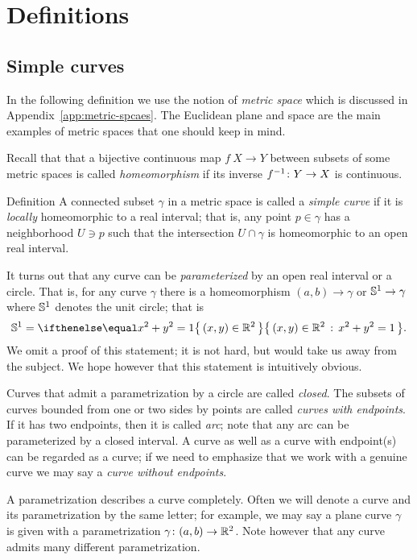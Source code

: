 \chapter{Definitions}


\section*{Simple curves}

In the following definition we use the notion of \emph{metric space} which is discussed in Appendix~\ref{app:metric-spcaes}.
The Euclidean plane and space are the main examples of metric spaces that one should keep in mind. 

Recall that that a bijective continuous map $f\:X\to Y$ between subsets of some metric spaces is called \emph{homeomorphism} if its inverse $f^{-1}\:Y\z\to X$ is continuous.  

\begin{thm}{Definition} 
A connected subset $\gamma$ in a metric space is called a \emph{simple curve} if it is \emph{locally} homeomorphic to a real interval; that is, any point $p\in\gamma$ has a neighborhood $U\ni p$ such that the intersection
$U\cap \gamma$ is homeomorphic to an open real interval.
\end{thm}

It turns out that any curve can be \emph{parameterized} by an open real interval or a circle.
That is, for any curve $\gamma$ there is a homeomorphism $(a,b)\to\gamma$ or $\mathbb{S}^1\to\gamma$ 
where $\mathbb{S}^1$ denotes the unit circle; that is 
\[\SS^1=\set{(x,y)\in\RR^2}{x^2+y^2=1}.\]
We omit a proof of this statement; it is not hard, but would take us away from the subject.
We hope however that this statement is intuitively obvious. %

Curves that admit a parametrization by a circle are called \emph{closed}.
The subsets of curves bounded from one or two sides by points are called \emph{curves with endpoints}.
If it has two endpoints, then it is called \emph{arc}; note that any arc can be parameterized by a closed interval.
A curve as well as a curve with endpoint(s) can be regarded as a curve;
if we need to emphasize that we work with a genuine curve we may say a \emph{curve without endpoints}.


A parametrization describes a curve completely.
Often we will denote a curve and its parametrization by the same letter;
for example, we may say a plane curve $\gamma$ is given with a parametrization $\gamma\colon(a,b)\to \mathbb{R}^2$.
Note however that any curve admits many different parametrization. 

